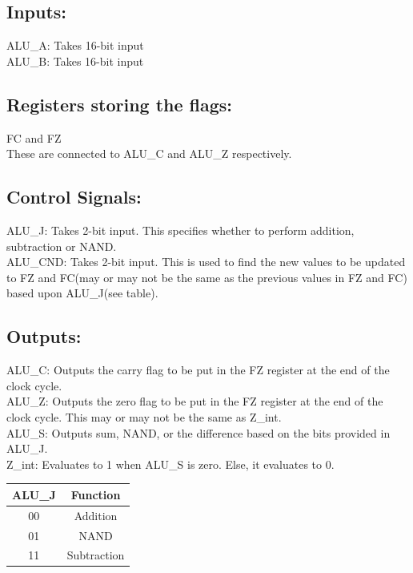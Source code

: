 \documentclass[]{report}
\begin{document}
    \subsection*{Inputs:}
    ALU\_A: Takes 16-bit input \\
    ALU\_B: Takes 16-bit input \\

    \subsection*{Registers storing the flags:}
    FC and FZ \\
    These are connected to ALU\_C and ALU\_Z respectively.

    \subsection*{Control Signals:}
    ALU\_J: Takes 2-bit input. This specifies whether to perform addition, subtraction or NAND. \\
    ALU\_CND: Takes 2-bit input. This is used to find the new values to be updated to FZ and FC(may or may not be the same as the previous values in FZ and FC) based upon ALU\_J(see table). \\

    \subsection*{Outputs:}
    ALU\_C: Outputs the carry flag to be put in the FZ register at the end of the clock cycle. \\
    ALU\_Z: Outputs the zero flag to be put in the FZ register at the end of the clock cycle. This may or may not be the same as Z\_int. \\
    ALU\_S: Outputs sum, NAND, or the difference based on the bits provided in ALU\_J. \\
    Z\_int: Evaluates to 1 when ALU\_S is zero. Else, it evaluates to 0. \\

\begin{center}
    \begin{tabular}{|c|c|}
        \hline
        ALU\_J & Function \\
        \hline
        00 & Addition \\
        \hline
        01 & NAND \\
        \hline
        11 & Subtraction \\
        \hline
    \end{tabular}
\end{center}
\end{document}
